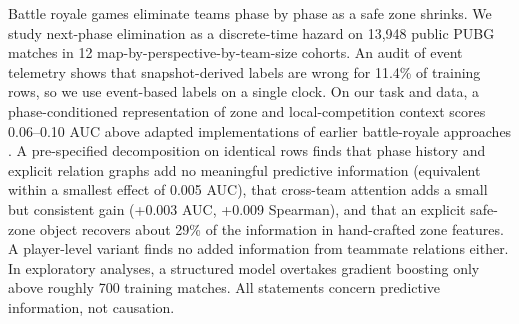 Battle royale games eliminate teams phase by phase as a safe zone shrinks. We study next-phase elimination as a discrete-time hazard on 13,948 public PUBG matches in 12 map-by-perspective-by-team-size cohorts. An audit of event telemetry shows that snapshot-derived labels are wrong for 11.4\% of training rows, so we use event-based labels on a single clock. On our task and data, a phase-conditioned representation of zone and local-competition context scores 0.06--0.10 AUC above adapted implementations of earlier battle-royale approaches . A pre-specified decomposition on identical rows finds that phase history and explicit relation graphs add no meaningful predictive information (equivalent within a smallest effect of 0.005 AUC), that cross-team attention adds a small but consistent gain (+0.003 AUC, +0.009 Spearman), and that an explicit safe-zone object recovers about 29\% of the information in hand-crafted zone features.
A player-level variant finds no added information from teammate relations either.
In exploratory analyses, a structured model overtakes gradient boosting only above roughly 700 training matches. All statements concern predictive information, not causation.
